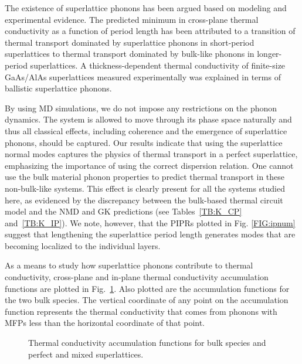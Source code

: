 \documentclass[aps,prb,preprint,preprintnumbers,amsmath,amssymb,floatfix,superscriptaddress]{revtex4}
\begin{document}
The existence of superlattice phonons has been argued based on modeling and experimental evidence. The predicted minimum in cross-plane thermal conductivity as a function of period length{\color{red}\cite{PhysRevB.66.024301,PhysRevB.77.184302,PhysRevB.67.195311,PhysRevB.72.174302,PhysRevB.61.3091,Imamura2003Lattice}} has been attributed to a transition of thermal transport dominated by superlattice phonons in short-period superlattices to thermal transport dominated by bulk-like phonons in longer-period superlattices.\cite{PhysRevLett.84.927,PhysRevB.56.10754} A thickness-dependent thermal conductivity of finite-size GaAs/AlAs superlattices measured experimentally was explained in terms of ballistic superlattice phonons.\cite{Luckyanova16112012} 

By using MD simulations, we do not impose any restrictions on the phonon dynamics. The system is allowed to move through its phase space naturally and thus all classical effects, including coherence and the emergence of superlattice phonons, should be captured. Our results indicate that using the superlattice normal modes captures the physics of thermal transport in a perfect superlattice, emphasizing the importance of using the correct dispersion relation. One cannot use the bulk material phonon properties to predict thermal transport in these non-bulk-like systems. This effect is clearly present for all the systems studied here, as evidenced by the discrepancy between the bulk-based thermal circuit model and the NMD and GK predictions (see Tables~\ref{TB:K_CP} and~\ref{TB:K_IP}). We note, however, that the PIPRs plotted in Fig. \ref{FIG:ipnum} suggest that lengthening the superlattice period length generates modes that are becoming localized to the individual layers.

As a means to study how superlattice phonons contribute to thermal conductivity, cross-plane and in-plane thermal conductivity accumulation functions are plotted in Fig.~\ref{FIG:MFP_cuml}. Also plotted are the accumulation functions for the two bulk species. The vertical coordinate of any point on the accumulation function represents the thermal conductivity that comes from phonons with MFPs less than the horizontal coordinate of that point.{\color{red}\cite{dames2005thermal}}

\begin{figure}%
\begin{center}
\renewcommand{\figure}{Fig.}
\caption{Thermal conductivity accumulation functions for bulk species and perfect and mixed superlattices.}
\label{FIG:MFP_cuml}
\end{center}
\end{figure}
\end{document}
